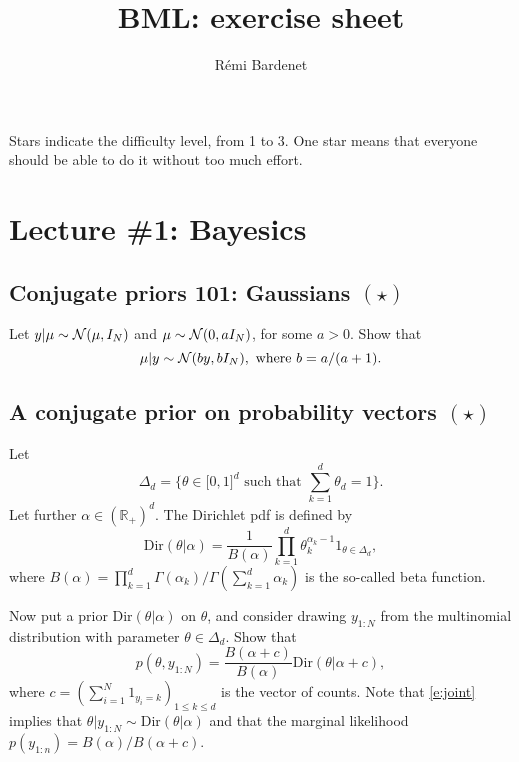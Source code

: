 \documentclass{article}
\title{BML: exercise sheet}
\date{}
\author{R\'emi Bardenet}
\newif\ifsolutions
\newcommand\solution[1]{
\ifsolutions
\begin{mdframed}[style=MyFrame]
\textcolor{bleu}{\textbf{Solution:} #1}
\end{mdframed}
\fi
}
\begin{document}
\maketitle

Stars indicate the difficulty level, from 1 to 3. One star means that everyone should be able to do it without too much effort.

\tableofcontents

\section{Lecture \#1: Bayesics}

\subsection{Conjugate priors 101: Gaussians $(\star)$}
\label{s:gaussianConjugacy}
Let $y\vert\mu \sim \mathcal{N}(\mu,I_N)$ and $\mu\sim \mathcal{N}(0,a I_N)$, for some $a>0$. Show that
\begin{equation}
  \mu\vert y \sim \mathcal{N}(b y,bI_N), \text{ where } b=a/(a+1).
  \label{e:gaussianConjugacy}
\end{equation}

\solution{
We apply Bayes' theorem and keep track of only the terms that will not end up in the normalization constant of the posterior. This gives
\begin{align*}
  \log p(\mu\vert y) &\propto \log p(y\vert\mu) + \log p(\mu)\\
  &\propto - \frac{\Vert y-\mu\Vert^2}{2} - \frac{\Vert \mu\Vert^2}{2a}\\
  & \propto -\frac12 \Vert\mu\Vert^2\left(1+\frac1a \right) + y^T\mu\\
  & \propto - \frac{\Vert \mu - by\Vert^2}{2b}.
\end{align*}
}

\subsection{A conjugate prior on probability vectors $(\star)$}
Let
$$
\Delta_d = \{\theta\in\mathbb[0,1]^d \text{ such that } \sum_{k=1}^d \theta_d = 1\}.
$$
Let further $\alpha\in(\mathbb{R}_+)^d$. The Dirichlet pdf is defined by
 $$
 \text{Dir}(\theta\vert \alpha) = \frac{1}{B(\alpha)} \prod_{k=1}^d \theta_k^{\alpha_k -1} 1_{\theta\in \Delta_d},$$
where
 $ B(\alpha) = \prod_{k=1}^d \Gamma(\alpha_k) / \Gamma(\sum_{k=1}^d \alpha_k)$
 is the so-called beta function.

 Now put a prior $\text{Dir}(\theta\vert \alpha)$ on $\theta$, and consider drawing $y_{1:N}$ from the multinomial distribution with parameter $\theta\in\Delta_d$. Show that
 \begin{equation}
   p(\theta, y_{1:N}) = \frac{B(\alpha+c)}{B(\alpha)} \text{Dir}(\theta\vert \alpha + c),
\label{e:joint}
 \end{equation}
 where $c=(\sum_{i=1}^N 1_{y_i=k})_{1\leq k \leq d}$ is the vector of counts. Note that \eqref{e:joint} implies that $\theta\vert y_{1:N} \sim \text{Dir}(\theta\vert \alpha)$ and that the marginal likelihood $p(y_{1:n}) = B(\alpha)/B(\alpha+c)$.
\end{document}
